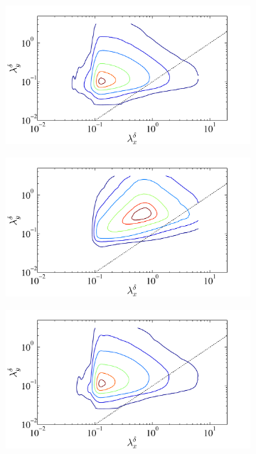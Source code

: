 \begin{figure}
\begin{subfigure}[t]{0.5\textwidth}
                \caption{}
                \label{fig:energy2}
        \end{subfigure}%
        \centering
        \begin{subfigure}[t]{0.5\textwidth}
                \includegraphics[width=\linewidth]{Fig2/dissp_contour_ABL_n05_filt2_level4.pdf}
                \caption{}
                \label{fig:dissip2}
        \end{subfigure}
 \centering
        \begin{subfigure}[t]{0.5\textwidth}
                \includegraphics[width=\linewidth]{Fig2/energy_contour_ABL_n05_filt2_level5.pdf}
                \caption{}
                \label{fig:energy3}
        \end{subfigure}%
        \centering
        \begin{subfigure}[t]{0.5\textwidth}
                \includegraphics[width=\linewidth]{Fig2/dissp_contour_ABL_n05_filt2_level5.pdf}
                \caption{}
                \label{fig:dissip3}
        \end{subfigure}              
        

\end{figure}
